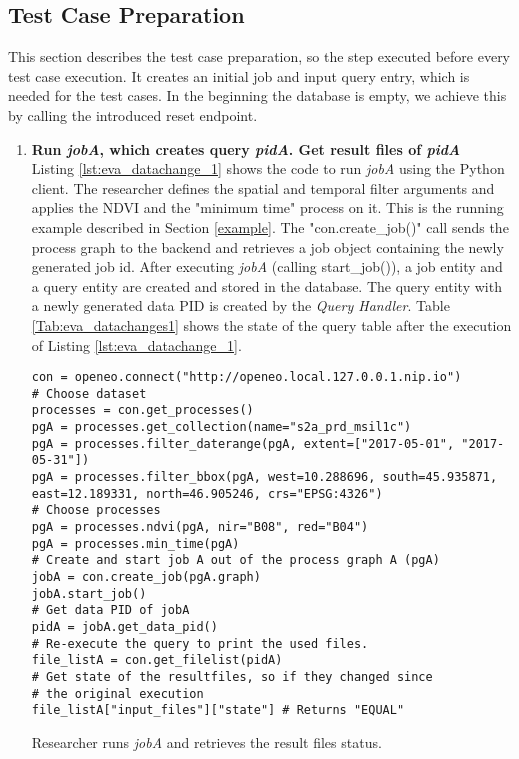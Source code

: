 \documentclass[draft,final]{vutinfth} %
\newenvironment{code}{\captionsetup{type=listing}}{}
\begin{document}
\subsection{Test Case Preparation}
This section describes the test case preparation, so the step executed before every test case execution. It creates an initial job and input query entry, which is needed for the test cases. In the beginning the database is empty, we achieve this by calling the introduced reset endpoint. \\ 


\begin{enumerate}
	\item \textbf{Run \textit{jobA}, which creates query \textit{pidA}. Get result files of \textit{pidA}} \\
	Listing \ref{lst:eva_datachange_1} shows the code to run \textit{jobA} using the Python client. The researcher defines the spatial and temporal filter arguments and applies the NDVI and the "minimum time" process on it. This is the running example described in Section \ref{example}. The "con.create\_job()" call sends the process graph to the backend and retrieves a job object containing the newly generated job id. After executing \textit{jobA} (calling start\_job()), a job entity and a query entity are created and stored in the database. The query entity with a newly generated data PID is created by the \textit{Query Handler}. Table \ref{Tab:eva_datachanges1} shows the state of the query table after the execution of Listing \ref{lst:eva_datachange_1}.
	\newpage
	\begin{code}
		\begin{verbatim}
con = openeo.connect("http://openeo.local.127.0.0.1.nip.io")
# Choose dataset
processes = con.get_processes()
pgA = processes.get_collection(name="s2a_prd_msil1c")
pgA = processes.filter_daterange(pgA, extent=["2017-05-01", "2017-05-31"])
pgA = processes.filter_bbox(pgA, west=10.288696, south=45.935871, 
east=12.189331, north=46.905246, crs="EPSG:4326")
# Choose processes
pgA = processes.ndvi(pgA, nir="B08", red="B04")
pgA = processes.min_time(pgA)
# Create and start job A out of the process graph A (pgA)
jobA = con.create_job(pgA.graph)
jobA.start_job()
# Get data PID of jobA
pidA = jobA.get_data_pid()
# Re-execute the query to print the used files.
file_listA = con.get_filelist(pidA)
# Get state of the resultfiles, so if they changed since 
# the original execution 
file_listA["input_files"]["state"] # Returns "EQUAL"
		\end{verbatim}
		\caption{Researcher runs \textit{jobA} and retrieves the result files status.}
		\label{lst:eva_datachange_1}
	\end{code}


\end{enumerate}
\end{document}
